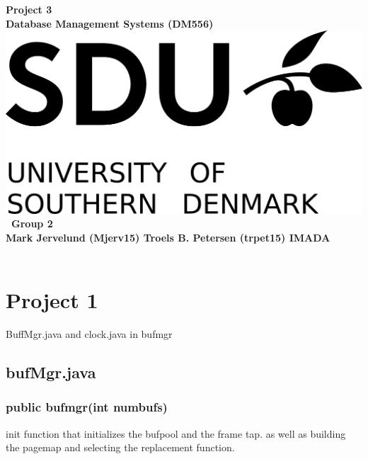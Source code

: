 \documentclass[a4paper,10pt,titlepage]{report}
\date{}
\begin{document}
\begin{titlepage}
\centering
    \vspace*{9\baselineskip}
    \huge
    \bfseries
    Project 3\\

    \normalfont
	\huge
    Database Management Systems (DM556)  \\[4\baselineskip]
    \normalfont
	\includegraphics[scale=1.5]{SDU_Logo}
    \vfill\
    Group 2\\
    Mark Jervelund (Mjerv15)    Troels B. Petersen (trpet15)
    \vspace{5mm}
    IMADA \\
    \textbf{\datedate} \\[2\baselineskip]
\end{titlepage}

\setcounter{page}{1}
\renewcommand{\thepage}{\arabic{page}}

\lstset{language=Java}          %

\section{Project 1}
BuffMgr.java and clock.java in bufmgr \\


\subsection{bufMgr.java} 

\subsubsection{public bufmgr(int numbufs)}
init function that initializes the bufpool and the frame tap. as well as building the pagemap and selecting the replacement function.
\end{document}
